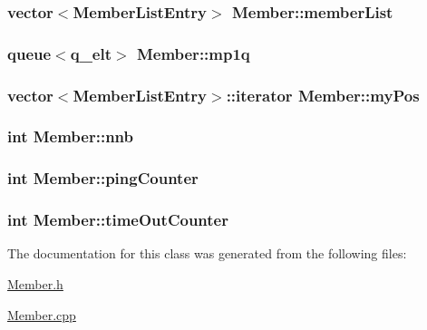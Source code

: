 \subsubsection[{member\+List}]{\setlength{\rightskip}{0pt plus 5cm}vector$<${\bf Member\+List\+Entry}$>$ Member\+::member\+List}\label{class_member_a7c3872c420af12628ce50bbc66010842}
\hypertarget{class_member_a62f45dfeaee8e141c328149f6c36efe2}{}
\subsubsection[{mp1q}]{\setlength{\rightskip}{0pt plus 5cm}queue$<${\bf q\+\_\+elt}$>$ Member\+::mp1q}\label{class_member_a62f45dfeaee8e141c328149f6c36efe2}
\hypertarget{class_member_a50bf6051866f7968484600b98d784303}{}
\subsubsection[{my\+Pos}]{\setlength{\rightskip}{0pt plus 5cm}vector$<${\bf Member\+List\+Entry}$>$\+::iterator Member\+::my\+Pos}\label{class_member_a50bf6051866f7968484600b98d784303}
\hypertarget{class_member_a74c51884e3d80e38ef3c25e8c111cd9b}{}
\subsubsection[{nnb}]{\setlength{\rightskip}{0pt plus 5cm}int Member\+::nnb}\label{class_member_a74c51884e3d80e38ef3c25e8c111cd9b}
\hypertarget{class_member_abc5127f9400138b743b8bc437758611a}{}
\subsubsection[{ping\+Counter}]{\setlength{\rightskip}{0pt plus 5cm}int Member\+::ping\+Counter}\label{class_member_abc5127f9400138b743b8bc437758611a}
\hypertarget{class_member_a30c6e44397b58f19f28383e2d454f6ad}{}
\subsubsection[{time\+Out\+Counter}]{\setlength{\rightskip}{0pt plus 5cm}int Member\+::time\+Out\+Counter}\label{class_member_a30c6e44397b58f19f28383e2d454f6ad}


The documentation for this class was generated from the following files\+:\begin{DoxyCompactItemize}
\item 
\hyperlink{_member_8h}{Member.\+h}\item 
\hyperlink{_member_8cpp}{Member.\+cpp}\end{DoxyCompactItemize}
